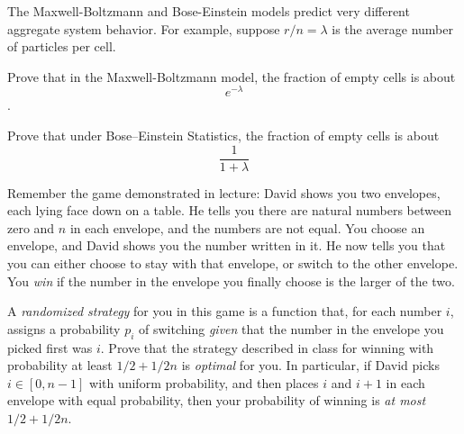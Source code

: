 \documentclass[12pt,twoside]{article}
\begin{document}
\begin{problems}

The Maxwell-Boltzmann and Bose-Einstein models predict very different
aggregate system behavior.
For example, suppose $r/n = \lambda$ is the average number of particles per cell.  

\ppart Prove that in the Maxwell-Boltzmann model, the fraction of empty
cells is about
\[
e^{-\lambda}
\].


\ppart Prove that under Bose--Einstein Statistics, the fraction of empty
cells is about
\[
\frac{1}{1+\lambda}
\]


\eparts

\problem Remember the game demonstrated in lecture: David shows you two
envelopes, each lying face down on a table.  He tells you there are
natural numbers between zero and $n$ in each envelope, and the numbers are
not equal.  You choose an envelope, and David shows you the number
written in it.  He now tells you that you can either choose to stay with
that envelope, or switch to the other envelope.  You {\em win} if the
number in the envelope you finally choose is the larger of the two.

\bparts

\ppart A \emph{randomized strategy} for you in this game is a function
that, for each number $i$, assigns a probability $p_i$ of switching {\em
given} that the number in the envelope you picked first was $i$.  Prove
that the strategy described in class for winning with probability at least
$1/2 + 1/2n$ is \emph{optimal} for you.  In particular, if David picks $i
\in [0,n-1]$ with uniform probability, and then places $i$ and $i+1$ in
each envelope with equal probability, then your probability of winning is
\emph{at most} $1/2 + 1/2n$.


\end{problems}
\end{document}
